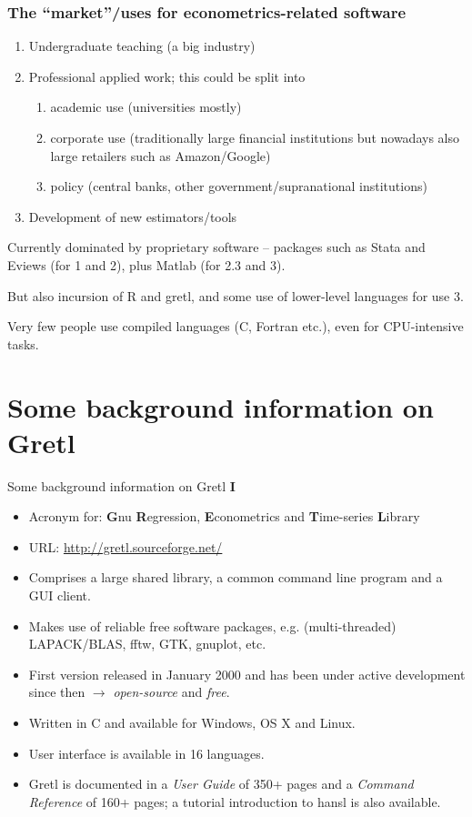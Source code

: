 \documentclass{beamer}[11pt]
\begin{document}
\begin{frame}
	\frametitle{The ``market''/uses for econometrics-related
		software}
	
	\begin{enumerate}
		\item Undergraduate teaching (a big industry)
		\item Professional applied work; this could be split into
		\begin{enumerate}
			\item academic use (universities mostly)
			\item corporate use (traditionally large financial institutions but nowadays also large retailers such as Amazon/Google)
			\item policy (central banks, other government/supranational institutions)
		\end{enumerate}
		\item Development of new estimators/tools
	\end{enumerate}
	
	Currently dominated by proprietary software -- packages such as
	Stata and Eviews (for 1 and 2), plus Matlab (for 2.3 and 3).
	\medskip
	
	But	also incursion of R and gretl, and some use of lower-level languages for use 3.
	\medskip
	
	Very few people use compiled languages (C, Fortran etc.), even for CPU-intensive tasks.
\end{frame}


\section{Some background information on Gretl}

\begin{frame}{Some background information on Gretl \textbf{I}}
	\begin{itemize}
		\item Acronym for: 
		\textbf{G}nu \textbf{R}egression, \textbf{E}conometrics and \textbf{T}ime-series \textbf{L}ibrary
		\item URL: \url{http://gretl.sourceforge.net/}
		\item Comprises a large shared library, a common command line program and a GUI client.
		\item Makes use of reliable free software packages, e.g. (multi-threaded) LAPACK/BLAS, fftw, GTK, gnuplot, etc.
		\item First version released in January 2000 and has been under active development since then $ \to $ \textit{open-source} and \textit{free}.
		\item Written in C and available for Windows, OS X and Linux.
		\item User interface is available in 16 languages.
		\item Gretl is documented in a \textit{User Guide} of 350+ pages and a \textit{Command Reference} of 160+ pages; a tutorial introduction to hansl is also available.		
	\end{itemize}
\end{frame}
\end{document}
